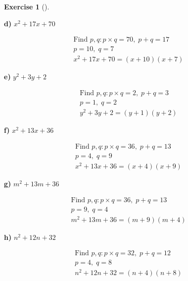 \documentclass[
  letterpaper,
  DIV=11,
  numbers=noendperiod]{scrreprt}
\theoremstyle{definition}
\newtheorem{exercise}{Exercise}[chapter]
\theoremstyle{remark}
\begin{document}
\begin{exercise}[]
\begin{tcolorbox}
\textbf{d)} \(\displaystyle x^2 + 17x + 70\)

\begin{align*}
\text{Find } p, q: p \times q = 70,\; p + q = 17 \\ p = 10,\; q = 7 \\ x^2 + 17x + 70 = (x + 10)(x + 7)
\end{align*}

\textbf{e)} \(\displaystyle y^2 + 3y + 2\)

\begin{align*}
\text{Find } p, q: p \times q = 2,\; p + q = 3 \\ p = 1,\; q = 2 \\ y^2 + 3y + 2 = (y + 1)(y + 2)
\end{align*}

\textbf{f)} \(\displaystyle x^2 + 13x + 36\)

\begin{align*}
\text{Find } p, q: p \times q = 36,\; p + q = 13 \\ p = 4,\; q = 9 \\ x^2 + 13x + 36 = (x + 4)(x + 9)
\end{align*}

\textbf{g)} \(\displaystyle m^2 + 13m + 36\)

\begin{align*}
\text{Find } p, q: p \times q = 36,\; p + q = 13 \\ p = 9,\; q = 4 \\ m^2 + 13m + 36 = (m + 9)(m + 4)
\end{align*}

\textbf{h)} \(\displaystyle n^2 + 12n + 32\)

\begin{align*}
\text{Find } p, q: p \times q = 32,\; p + q = 12 \\ p = 4,\; q = 8 \\ n^2 + 12n + 32 = (n + 4)(n + 8)
\end{align*}

\end{tcolorbox}

\end{exercise}
\end{document}
